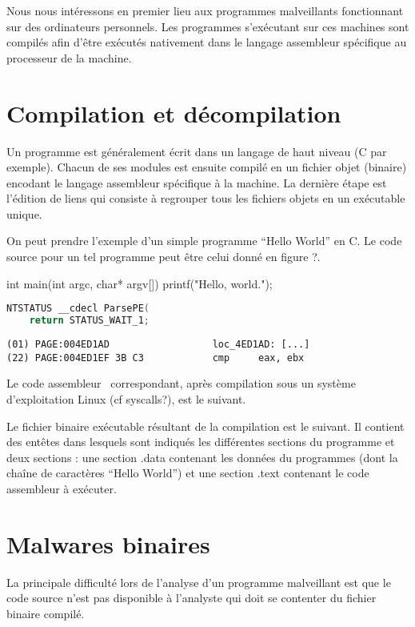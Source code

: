 
Nous nous intéressons en premier lieu aux programmes malveillants fonctionnant sur des ordinateurs personnels.
Les programmes s'exécutant sur ces machines sont compilés afin d'être exécutés nativement dans le langage assembleur spécifique au processeur de la machine.

\section{Compilation et décompilation}
Un programme est généralement écrit dans un langage de haut niveau (C par exemple). Chacun de ses modules est ensuite compilé en un fichier objet (binaire) encodant le langage assembleur spécifique à la machine. La dernière étape est l'édition de liens qui consiste à regrouper tous les fichiers objets en un exécutable unique.

On peut prendre l'exemple d'un simple programme ``Hello World'' en C. Le code source pour un tel programme peut être celui donné en figure ?.

int main(int argc, char* argv[]){
  printf("Hello, world.");
}


\begin{lstlisting}[language={C}]
NTSTATUS __cdecl ParsePE(
    return STATUS_WAIT_1; 
\end{lstlisting}


\begin{lstlisting}[language={[x86masm]Assembler}, escapechar=~]
(01) PAGE:004ED1AD                  loc_4ED1AD: [...]                      
(22) PAGE:004ED1EF 3B C3            cmp     eax, ebx
\end{lstlisting}

Le code assembleur \xq\ correspondant, après compilation sous un système d'exploitation Linux (cf syscalls?), est le suivant.

Le fichier binaire exécutable résultant de la compilation est le suivant. Il contient des entêtes dans lesquels sont indiqués les différentes sections du programme et deux sections : une section .data contenant les données du programmes (dont la chaîne de caractères ``Hello World'') et une section .text contenant le code assembleur à exécuter.
\section{Malwares binaires}
La principale difficulté lors de l'analyse d'un programme malveillant est que le code source n'est pas disponible à l'analyste qui doit se contenter du fichier binaire compilé.

